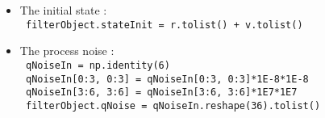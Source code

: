 \begin{itemize}
{                              0.0, 0.0, 0.0, 0.0, 0.0, 5.*1E6]}
 \item The initial state :\\
  \texttt{      filterObject.stateInit = r.tolist() + v.tolist()} 
    \item The process noise :\\
  \texttt{     qNoiseIn = np.identity(6)} \\
  \texttt{     qNoiseIn[0:3, 0:3] = qNoiseIn[0:3, 0:3]*1E-8*1E-8} \\
  \texttt{     qNoiseIn[3:6, 3:6] = qNoiseIn[3:6, 3:6]*1E7*1E7} \\
  \texttt{     filterObject.qNoise = qNoiseIn.reshape(36).tolist()}
\end{itemize}


